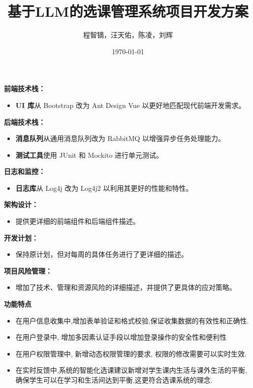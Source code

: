 \documentclass{article}
\title{基于LLM的选课管理系统项目开发方案}
\author{程智镝，汪天佑，陈凌，刘辉}
\date{\today}
\begin{document}
\maketitle

\textbf{前端技术栈：}
\begin{itemize}
    \item \textbf{UI 库}从 Bootstrap 改为 Ant Design Vue 以更好地匹配现代前端开发需求。
\end{itemize}

\textbf{后端技术栈：}
\begin{itemize}
    \item \textbf{消息队列}从通用消息队列改为 RabbitMQ 以增强异步任务处理能力。
    \item \textbf{测试工具}使用 JUnit 和 Mockito 进行单元测试。
\end{itemize}

\textbf{日志和监控：}
\begin{itemize}
    \item \textbf{日志库}从 Log4j 改为 Log4j2 以利用其更好的性能和特性。
\end{itemize}

\textbf{架构设计：}
\begin{itemize}
    \item 提供更详细的前端组件和后端组件描述。
\end{itemize}

\textbf{开发计划：}
\begin{itemize}
    \item 保持原计划，但对每周的具体任务进行了更详细的描述。
\end{itemize}

\textbf{项目风险管理：}
\begin{itemize}
    \item 增加了技术、管理和资源风险的详细描述，并提供了更具体的应对策略。
\end{itemize}

\textbf{功能特点}
\begin{itemize}
        \item 在用户信息收集中,增加表单验证和格式校验,保证收集数据的有效性和正确性.
        \item 在用户登录中, 增加多因素认证手段以增加登录操作的安全性和便利性
        \item 在用户权限管理中, 新增动态权限管理的要求, 权限的修改需要可以实时生效.
        \item 在实时反馈中,系统的智能化选课建议新增对学生课内生活与课外生活的平衡,确保学生可以在学习和生活间达到平衡,这更符合选课系统的理念.
\end{itemize}
\end{document}
